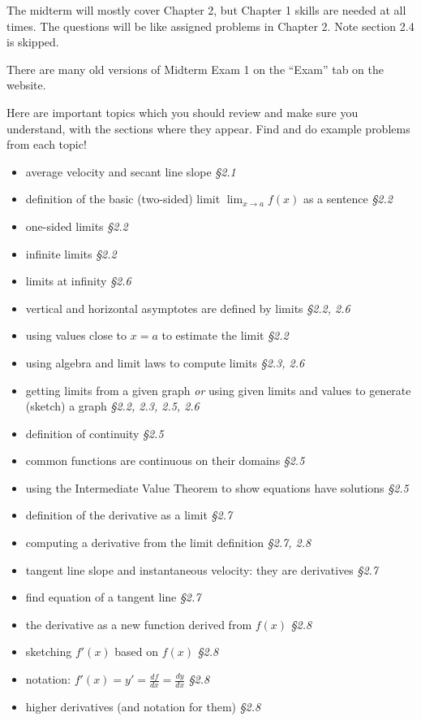 \documentclass[12pt]{article}
\begin{document}
\renewcommand{\d}{\displaystyle}

The midterm will mostly cover Chapter 2, but Chapter 1 skills are needed at all times.  The questions will be like assigned problems in Chapter 2.  Note section 2.4 is skipped.

There are many old versions of Midterm Exam 1 on the ``Exam'' tab on the website.

Here are important topics which you should review and make sure you understand, with the sections where they appear.  Find and do example problems from each topic!
\begin{itemize}
\item average velocity and secant line slope \hfill \emph{\S 2.1}
\item definition of the basic (two-sided) limit $\lim_{x\to a} f(x)$ as a sentence \hfill\emph{\S 2.2}
\item one-sided limits  \hfill \emph{\S 2.2}
\item infinite limits  \hfill \emph{\S 2.2}
\item limits at infinity  \hfill \emph{\S 2.6}
\item vertical and horizontal asymptotes are defined by limits  \hfill \emph{\S 2.2, 2.6}
\item using values close to $x=a$ to estimate the limit  \hfill \emph{\S 2.2}
\item using algebra and limit laws to compute limits  \hfill \emph{\S 2.3, 2.6}
\item getting limits from a given graph \emph{or} using given limits and values to generate (sketch) a graph  \hfill \emph{\S 2.2, 2.3, 2.5, 2.6}
\item definition of continuity  \hfill \emph{\S 2.5}
\item common functions are continuous on their domains  \hfill \emph{\S 2.5}
\item using the Intermediate Value Theorem to show equations have solutions \hfill \emph{\S 2.5}
\item definition of the derivative as a limit  \hfill \emph{\S 2.7}
\item computing a derivative from the limit definition  \hfill \emph{\S 2.7, 2.8}
\item tangent line slope and instantaneous velocity: they are derivatives  \hfill \emph{\S 2.7}
\item find equation of a tangent line  \hfill \emph{\S 2.7}
\item the derivative as a new function derived from $f(x)$  \hfill \emph{\S 2.8}
\item sketching $f'(x)$ based on $f(x)$  \hfill \emph{\S 2.8}
\item notation: $f'(x)=y'=\frac{df}{dx}=\frac{dy}{dx}$  \hfill \emph{\S 2.8}
\item higher derivatives (and notation for them)  \hfill \emph{\S 2.8}
\end{itemize}
\end{document}
